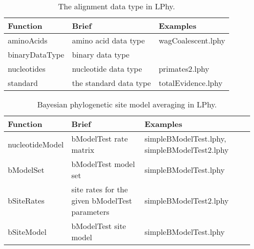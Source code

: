 \documentclass[12pt]{article} %
\begin{document}
\begin{table}
\begin{tabular}{ l | l | l }
    \hline\hline
    Function & Brief & Examples \\ 
    \hline\hline
    aminoAcids & amino acid data type & wagCoalescent.lphy\\  
    binaryDataType & binary data type & \\  
    nucleotides & nucleotide data type & primates2.lphy\\  
    standard & the standard data type & totalEvidence.lphy\\  
    \hline
\end{tabular}
\label{tab:coalescent}
\caption{The alignment data type in LPhy.}
\end{table}

\begin{table}
\begin{tabular}{ l | l | l }
    \hline\hline
    Function & Brief & Examples \\ 
    \hline\hline
    nucleotideModel & bModelTest\cite{bouckaert2017bmodeltestcomparison} rate matrix & simpleBModelTest.lphy, simpleBModelTest2.lphy\\  
    bModelSet & bModelTest model set & simpleBModelTest.lphy\\  
    bSiteRates & site rates for the given bModelTest parameters & simpleBModelTest2.lphy\\  
    bSiteModel & bModelTest site model & simpleBModelTest.lphy\\  
        \hline
\end{tabular}
\label{tab:coalescent}
\caption{Bayesian phylogenetic site model averaging in LPhy.}
\end{table}

\clearpage




\end{document}
